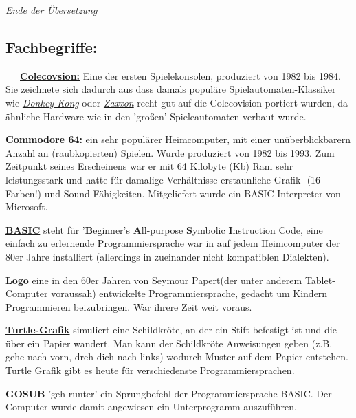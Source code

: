 \textit{Ende der Übersetzung}



\subsection*{Fachbegriffe:}
~~~\href{https://de.wikipedia.org/wiki/Colecovision}{\textbf{Colecovsion:}} Eine der ersten Spielekonsolen, produziert von 1982 bis 1984. Sie zeichnete sich dadurch aus dass damals populäre Spielautomaten-Klassiker wie \href{https://de.wikipedia.org/wiki/Donkey_Kong}{\textit{Donkey Kong}} oder \href{https://de.wikipedia.org/wiki/Zaxxon}{\textit{Zaxxon}} recht gut auf die Colecovision portiert wurden, da ähnliche Hardware wie in den 'großen' Spieleautomaten verbaut wurde.

\href{https://de.wikipedia.org/wiki/Commodore_64}{\textbf{Commodore 64:}} ein sehr populärer Heimcomputer, mit einer unüberblickbarern Anzahl an (raubkopierten) Spielen. Wurde produziert von 1982 bis 1993. Zum Zeitpunkt seines Erscheinens war er mit 64 Kilobyte (Kb) Ram sehr leistungsstark und hatte für damalige Verhältnisse erstaunliche Grafik- (16 Farben!) und Sound-Fähigkeiten. Mitgeliefert wurde ein BASIC Interpreter von Microsoft.

\href{https://de.wikipedia.org/wiki/BASIC}{\textbf{BASIC}} steht für '\textbf{B}eginner’s \textbf{A}ll-purpose \textbf{S}ymbolic \textbf{I}nstruction Code, eine einfach zu erlernende Programmiersprache war in auf jedem Heimcomputer der 80er Jahre installiert (allerdings in zueinander nicht kompatiblen Dialekten). 

\href{https://de.wikipedia.org/wiki/Logo_(Programmiersprache)}{\textbf{Logo}} eine in den 60er Jahren von \href{https://de.wikipedia.org/wiki/Seymour_Papert}{Seymour Papert}(der unter anderem Tablet-Computer voraussah) entwickelte Programmiersprache, gedacht um \href{http://goo.gl/zJG9WU}{Kindern} Programmieren beizubringen. War ihrere Zeit weit voraus.

\href{https://de.wikipedia.org/wiki/Turtlegraphics}{\textbf{Turtle-Grafik}} simuliert eine Schildkröte, an der ein Stift befestigt ist und die über ein Papier wandert. Man kann der Schildkröte Anweisungen geben (z.B. gehe nach vorn, dreh dich nach links) wodurch Muster auf dem Papier entstehen. Turtle Grafik gibt es heute für verschiedenste Programmiersprachen.

\textbf{GOSUB} 'geh runter' ein Sprungbefehl der Programmiersprache BASIC. Der Computer wurde damit angewiesen ein Unterprogramm auszuführen.

